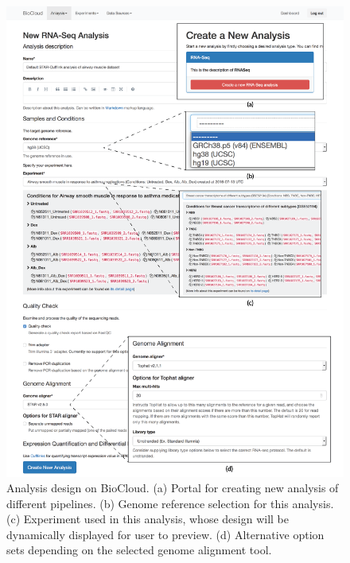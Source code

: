 \begin{figure}[!p]
\centering
\includegraphics[width=1\textwidth]{images/biocloud_analysis_design}
\caption[Analysis design on BioCloud]{
    Analysis design on BioCloud.
    (a) Portal for creating new analysis of different pipelines.
    (b) Genome reference selection for this analysis.
    (c) Experiment used in this analysis, whose design will be dynamically
        displayed for user to preview.
    (d) Alternative option sets depending on the selected genome alignment
        tool.
}
\label{fig:biocloud-analysis-design}
\end{figure}
